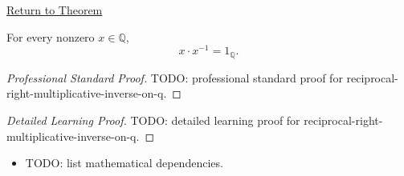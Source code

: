 \newpage
{}
\label{prf:reciprocal-right-multiplicative-inverse-on-q}

\begin{remark*}[Return]
\hyperref[cor:reciprocal-right-multiplicative-inverse-on-q]{Return to Theorem}
\end{remark*}

\begin{corollary*}
For every nonzero $x\in\mathbb{Q}$,
\[
x\cdot x^{-1}=1_{\mathbb{Q}}.
\]
\end{corollary*}

\begin{proof}[Professional Standard Proof]
\LRAProofBodyStart
TODO: professional standard proof for reciprocal-right-multiplicative-inverse-on-q.
\end{proof}

\begin{proof}[Detailed Learning Proof]
\LRAProofBodyStart
TODO: detailed learning proof for reciprocal-right-multiplicative-inverse-on-q.
\end{proof}

\begin{remark*}
\end{remark*}

\begin{dependencies}
\begin{itemize}
  \item TODO: list mathematical dependencies.
\end{itemize}
\end{dependencies}

\clearpage
